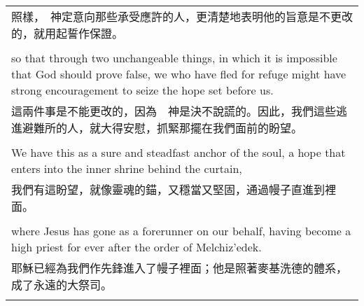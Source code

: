 \documentclass{book}
\begin{document}
\begin{tabularx}{\textwidth}{p{}}
照樣，　神定意向那些承受應許的人，更清楚地表明他的旨意是不更改的，就用起誓作保證。 \\ \\
so that through two unchangeable things, in which it is impossible that God should prove false, we who have fled for refuge might have strong encouragement to seize the hope set before us. \\
這兩件事是不能更改的，因為　神是決不說謊的。因此，我們這些逃進避難所的人，就大得安慰，抓緊那擺在我們面前的盼望。 \\ \\
We have this as a sure and steadfast anchor of the soul, a hope that enters into the inner shrine behind the curtain, \\
我們有這盼望，就像靈魂的錨，又穩當又堅固，通過幔子直進到裡面。 \\ \\
where Jesus has gone as a forerunner on our behalf, having become a high priest for ever after the order of Melchiz'edek. \\
耶穌已經為我們作先鋒進入了幔子裡面；他是照著麥基洗德的體系，成了永遠的大祭司。 \\ \\

\hline
\end{tabularx}

\newpage
\end{document}
